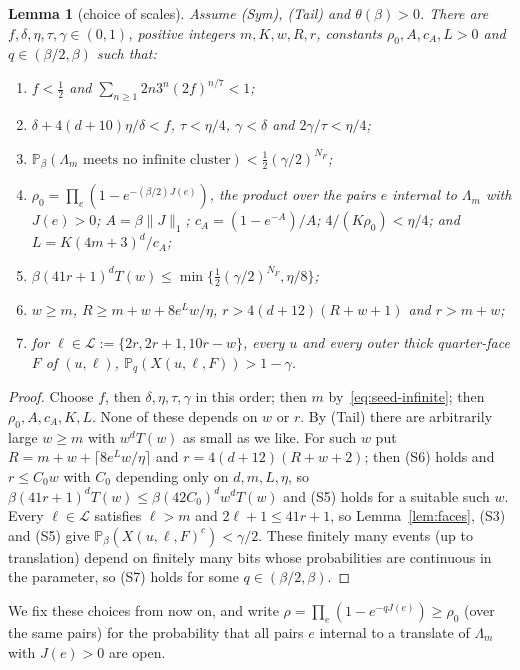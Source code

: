 \documentclass[11pt]{article}
\newtheorem{lemma}[theorem]{Lemma}
\theoremstyle{definition}
\theoremstyle{remark}
\numberwithin{equation}{section}
\newcommand{\Pp}{\mathbb P}
\newcommand{\1}{\mathbf 1}
\newcommand{\cL}{\mathcal L}
\newcommand{\Lam}{\Lambda}
\newcommand{\norm}[1]{\|#1\|}
\begin{document}
\begin{lemma}[choice of scales]\label{lem:scales}
Assume \textup{(Sym)}, \textup{(Tail)} and $\theta(\beta)>0$. There are $f,\delta,\eta,\tau,\gamma\in(0,1)$,
positive integers $m,K,w,R,r$, constants $\rho_0,A,c_A,L>0$ and $q\in(\beta/2,\beta)$ such that:
\begin{enumerate}
\item[(S1)] $f<\frac12$ and $\sum_{n\ge1}2n3^n(2f)^{n/7}<1$;
\item[(S2)] $\delta+4(d+10)\eta/\delta<f$, $\tau<\eta/4$, $\gamma<\delta$ and $2\gamma/\tau<\eta/4$;
\item[(S3)] $\Pp_\beta(\Lam_m\text{ meets no infinite cluster})<\frac12(\gamma/2)^{N_F}$;
\item[(S4)] $\rho_0=\prod_e(1-e^{-(\beta/2)J(e)})$, the product over the pairs $e$ internal to $\Lam_m$ with $J(e)>0$;
$A=\beta\norm{J}_1$; $c_A=(1-e^{-A})/A$; $4/(K\rho_0)<\eta/4$; and $L=K(4m+3)^d/c_A$;
\item[(S5)] $\beta(41r+1)^dT(w)\le\min\{\frac12(\gamma/2)^{N_F},\eta/8\}$;
\item[(S6)] $w\ge m$, $R\ge m+w+8e^Lw/\eta$, $r>4(d+12)(R+w+1)$ and $r>m+w$;
\item[(S7)] for $\ell\in\cL:=\{2r,2r+1,10r-w\}$, every $u$ and every outer thick quarter-face $F$ of
$(u,\ell)$, $\Pp_q(X(u,\ell,F))>1-\gamma$.
\end{enumerate}
\end{lemma}
\begin{proof}
Choose $f$, then $\delta,\eta,\tau,\gamma$ in this order; then $m$ by~\eqref{eq:seed-infinite};
then $\rho_0,A,c_A,K,L$. None of these depends on $w$ or $r$. By (Tail) there are arbitrarily large
$w\ge m$ with $w^dT(w)$ as small as we like. For such $w$ put
$R=m+w+\lceil8e^Lw/\eta\rceil$ and $r=4(d+12)(R+w+2)$; then (S6) holds and $r\le C_0w$ with
$C_0$ depending only on $d,m,L,\eta$, so $\beta(41r+1)^dT(w)\le\beta(42C_0)^dw^dT(w)$ and (S5) holds
for a suitable such $w$. Every $\ell\in\cL$ satisfies $\ell>m$ and $2\ell+1\le41r+1$, so
Lemma~\ref{lem:faces}, (S3) and (S5) give $\Pp_\beta(X(u,\ell,F)^c)<\gamma/2$. These finitely many
events (up to translation) depend on finitely many bits whose probabilities are continuous in the
parameter, so (S7) holds for some $q\in(\beta/2,\beta)$.
\end{proof}

We fix these choices from now on, and write $\rho=\prod_e(1-e^{-qJ(e)})\ge\rho_0$ (over the same pairs) for the probability
that all pairs $e$ internal to a translate of $\Lam_m$ with $J(e)>0$ are open.
\end{document}
